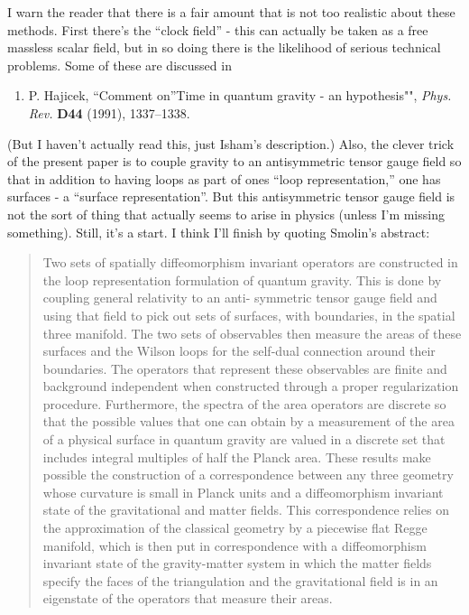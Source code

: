 \documentclass{article}
\def\tightlist{}
\begin{document}
I warn the reader that there is a fair amount that is not too realistic
about these methods. First there's the ``clock field'' - this can
actually be taken as a free massless scalar field, but in so doing there
is the likelihood of serious technical problems. Some of these are
discussed in

\begin{enumerate}
\def\labelenumi{\arabic{enumi})}
\setcounter{enumi}{5}
\tightlist
\item
  P. Hajicek, ``Comment on''Time in quantum gravity - an hypothesis"",
  \emph{Phys. Rev.} \textbf{D44} (1991), 1337--1338.
\end{enumerate}

(But I haven't actually read this, just Isham's description.) Also, the
clever trick of the present paper is to couple gravity to an
antisymmetric tensor gauge field so that in addition to having loops as
part of ones ``loop representation,'' one has surfaces - a ``surface
representation''. But this antisymmetric tensor gauge field is not the
sort of thing that actually seems to arise in physics (unless I'm
missing something). Still, it's a start. I think I'll finish by quoting
Smolin's abstract:

\begin{quote}
Two sets of spatially diffeomorphism invariant operators are constructed
in the loop representation formulation of quantum gravity. This is done
by coupling general relativity to an anti- symmetric tensor gauge field
and using that field to pick out sets of surfaces, with boundaries, in
the spatial three manifold. The two sets of observables then measure the
areas of these surfaces and the Wilson loops for the self-dual
connection around their boundaries. The operators that represent these
observables are finite and background independent when constructed
through a proper regularization procedure. Furthermore, the spectra of
the area operators are discrete so that the possible values that one can
obtain by a measurement of the area of a physical surface in quantum
gravity are valued in a discrete set that includes integral multiples of
half the Planck area. These results make possible the construction of a
correspondence between any three geometry whose curvature is small in
Planck units and a diffeomorphism invariant state of the gravitational
and matter fields. This correspondence relies on the approximation of
the classical geometry by a piecewise flat Regge manifold, which is then
put in correspondence with a diffeomorphism invariant state of the
gravity-matter system in which the matter fields specify the faces of
the triangulation and the gravitational field is in an eigenstate of the
operators that measure their areas.
\end{quote}
\end{document}
